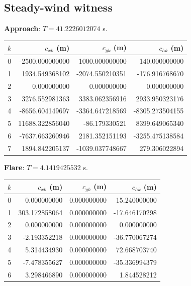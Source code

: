 \subsection*{Steady-wind witness}
\textbf{Approach}: $T=41.2226012074$ s.\par
\begin{center}\small\begin{tabular}{@{}rrrr@{}}\toprule $k$ & $c_{xk}$ (m) & $c_{yk}$ (m) & $c_{hk}$ (m)\\\midrule
0 & -2500.000000000 & 1000.000000000 & 140.000000000\\
1 & 1934.549368102 & -2074.550210351 & -176.916768670\\
2 & 0.000000000 & 0.000000000 & 0.000000000\\
3 & 3276.552981363 & 3383.062356916 & 2933.950323176\\
4 & -8656.604149697 & -3364.647218569 & -8305.273504155\\
5 & 11688.322856040 & -86.179330521 & 8399.649065340\\
6 & -7637.663260946 & 2181.352151193 & -3255.475138584\\
7 & 1894.842205137 & -1039.037748667 & 279.306022894\\
\bottomrule\end{tabular}\end{center}
\textbf{Flare}: $T=4.1419425532$ s.\par
\begin{center}\small\begin{tabular}{@{}rrrr@{}}\toprule $k$ & $c_{xk}$ (m) & $c_{yk}$ (m) & $c_{hk}$ (m)\\\midrule
0 & 0.000000000 & 0.000000000 & 15.240000000\\
1 & 303.172858064 & 0.000000000 & -17.646170298\\
2 & 0.000000000 & 0.000000000 & 0.000000000\\
3 & -2.193352218 & 0.000000000 & -36.770067274\\
4 & 5.314434930 & 0.000000000 & 72.668703740\\
5 & -7.478355627 & 0.000000000 & -35.336994379\\
6 & 3.298466890 & 0.000000000 & 1.844528212\\
\bottomrule\end{tabular}\end{center}
\par\medskip